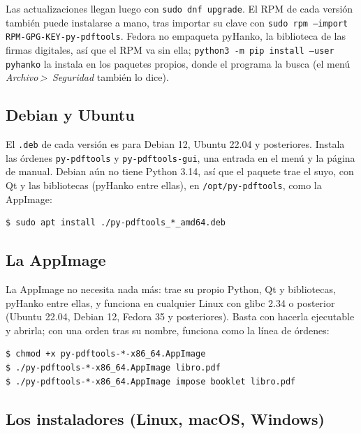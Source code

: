 \documentclass[12pt,
              article,
              oneside
              ]{memoir}
\newcommand*{\menu}[1]{\textit{#1}}
\newcommand*{\then}{\,>\,}
\begin{document}
\noindent{}%
Las actualizaciones llegan luego con \texttt{sudo dnf upgrade}.
El RPM de cada versión también puede instalarse a mano, tras importar su
clave con \texttt{sudo rpm --import RPM-GPG-KEY-py-pdftools}. Fedora no
empaqueta pyHanko, la biblioteca de las firmas digitales, así que el RPM va
sin ella; \texttt{python3 -m pip install --user pyhanko} la instala en los
paquetes propios, donde el programa la busca (el menú \menu{Archivo\then
Seguridad} también lo dice).

\subsection{Debian y Ubuntu}

%
El \texttt{.deb} de cada versión es para Debian 12, Ubuntu 22.04 y
posteriores. Instala las órdenes \texttt{py-pdftools} y
\texttt{py-pdftools-gui}, una entrada en el menú y la página de manual.
Debian aún no tiene Python 3.14, así que el paquete trae el suyo, con Qt y
las bibliotecas (pyHanko entre ellas), en \texttt{/opt/py-pdftools}, como
la AppImage:

\begin{verbatim}
$ sudo apt install ./py-pdftools_*_amd64.deb
\end{verbatim}

\subsection{La AppImage}

%
La AppImage no necesita nada más: trae su propio Python, Qt y bibliotecas,
pyHanko entre ellas, y funciona en cualquier Linux con glibc 2.34 o
posterior (Ubuntu 22.04, Debian 12, Fedora 35 y posteriores). Basta con
hacerla ejecutable y abrirla; con una orden tras su nombre, funciona como
la línea de órdenes:

\begin{verbatim}
$ chmod +x py-pdftools-*-x86_64.AppImage
$ ./py-pdftools-*-x86_64.AppImage libro.pdf
$ ./py-pdftools-*-x86_64.AppImage impose booklet libro.pdf
\end{verbatim}

\subsection{Los instaladores (Linux, macOS, Windows)}
\end{document}
